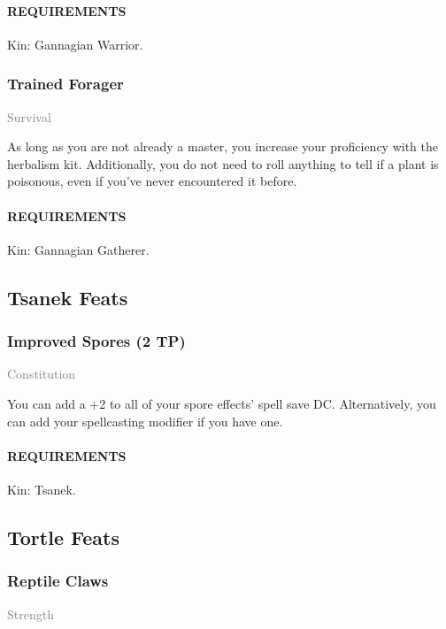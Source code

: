     \paragraph{REQUIREMENTS} Kin: Gannagian Warrior.

    \subsubsection{Trained Forager} \label{feat::trainedforager}
    \small{\textcolor{gray}{Survival}}

    \normalsize
    As long as you are not already a master, you increase your proficiency with the herbalism kit.
    Additionally, you do not need to roll anything to tell if a plant is poisonous, even if you've never encountered it before.
    \paragraph{REQUIREMENTS} Kin: Gannagian Gatherer.

\subsection*{Tsanek Feats}
    \subsubsection{Improved Spores (2 TP)} \label{feat::improvedspores}
    \small{\textcolor{gray}{Constitution}}

    \normalsize
    You can add a +2 to all of your spore effects' spell save DC.
    Alternatively, you can add your spellcasting modifier if you have one.
    \paragraph{REQUIREMENTS} Kin: Tsanek.

\subsection*{Tortle Feats}
    \subsubsection{Reptile Claws} \label{feat::reptileclaws}
    \small{\textcolor{gray}{Strength}}


